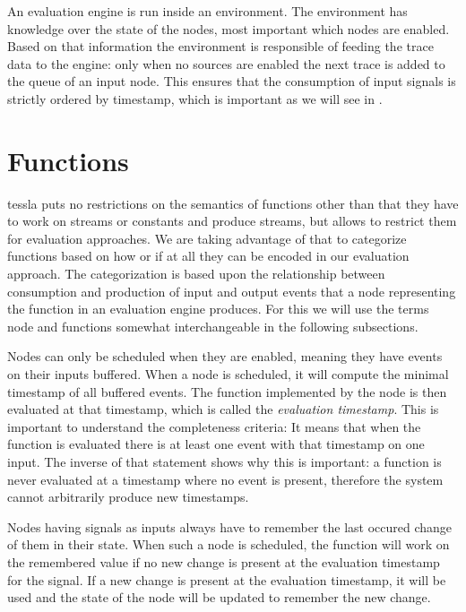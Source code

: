 An evaluation engine is run inside an environment.
The environment has knowledge over the state of the nodes, most important which nodes are enabled.
Based on that information the environment is responsible of feeding the trace data to the engine: only when no sources are enabled the next trace is added to the queue of an input node.
This ensures that the consumption of input signals is strictly ordered by timestamp, which is important as we will see in .


\section{ Functions}
\label{sec:definitions:tessla_functions}

\gls{tessla} puts no restrictions on the semantics of functions other than that they have to work on streams or constants and produce streams, but allows to restrict them for evaluation approaches.
We are taking advantage of that to categorize functions based on how or if at all they can be encoded in our evaluation approach.
The categorization is based upon the relationship between consumption and production of input and output events that a node representing the function in an evaluation engine produces.
For this we will use the terms node and functions somewhat interchangeable in the following subsections.

Nodes can only be scheduled when they are enabled, meaning they have events on their inputs buffered.
When a node is scheduled, it will compute the minimal timestamp of all buffered events.
The function implemented by the node is then evaluated at that timestamp, which is called the \emph{evaluation timestamp}.
This is important to understand the completeness criteria: It means that when the function is evaluated there is at least one event with that timestamp on one input.
The inverse of that statement shows why this is important: a function is never evaluated at a timestamp where no event is present, therefore the system cannot arbitrarily produce new timestamps.

Nodes having signals as inputs always have to remember the last occured change of them in their state.
When such a node is scheduled, the function will work on the remembered value if no new change is present at the evaluation timestamp for the signal.
If a new change is present at the evaluation timestamp, it will be used and the state of the node will be updated to remember the new change.

